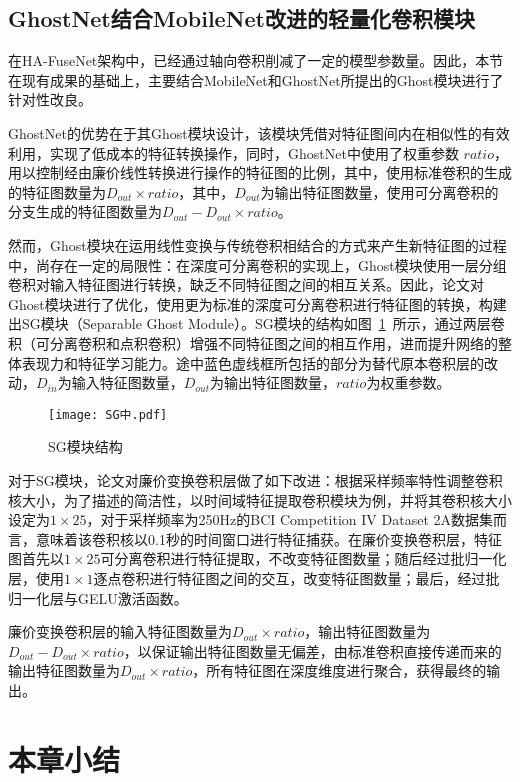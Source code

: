 \subsection{GhostNet结合MobileNet改进的轻量化卷积模块}

在HA-FuseNet架构中，已经通过轴向卷积削减了一定的模型参数量。因此，本节在现有成果的基础上，主要结合MobileNet和GhostNet所提出的Ghost模块进行了针对性改良。

GhostNet的优势在于其Ghost模块设计，该模块凭借对特征图间内在相似性的有效利用，实现了低成本的特征转换操作，同时，GhostNet中使用了权重参数 \(ratio\)，用以控制经由廉价线性转换进行操作的特征图的比例，其中，使用标准卷积的生成的特征图数量为\(D_{out} \times ratio\)，其中，\(D_{out}\)为输出特征图数量，使用可分离卷积的分支生成的特征图数量为\(D_{out}-D_{out} \times ratio\)。

然而，Ghost模块在运用线性变换与传统卷积相结合的方式来产生新特征图的过程中，尚存在一定的局限性：在深度可分离卷积的实现上，Ghost模块使用一层分组卷积对输入特征图进行转换，缺乏不同特征图之间的相互关系。因此，论文对Ghost模块进行了优化，使用更为标准的深度可分离卷积进行特征图的转换，构建出SG模块（Separable Ghost Module）。SG模块的结构如图~\ref{fig:sg}~所示，通过两层卷积（可分离卷积和点积卷积）增强不同特征图之间的相互作用，进而提升网络的整体表现力和特征学习能力。途中蓝色虚线框所包括的部分为替代原本卷积层的改动，\(D_{in}\)为输入特征图数量，\(D_{out}\)为输出特征图数量，\(ratio\)为权重参数。
\begin{figure}[ht]
    \centering
    \texttt{[image: SG中.pdf]}
    \caption{SG模块结构}
    \label{fig:sg}
\end{figure}

对于SG模块，论文对廉价变换卷积层做了如下改进：根据采样频率特性调整卷积核大小，为了描述的简洁性，以时间域特征提取卷积模块为例，并将其卷积核大小设定为\(1 \times 25\)，对于采样频率为250Hz的BCI Competition IV Dataset 2A数据集而言，意味着该卷积核以0.1秒的时间窗口进行特征捕获。在廉价变换卷积层，特征图首先以\(1 \times 25\)可分离卷积进行特征提取，不改变特征图数量；随后经过批归一化层，使用\(1 \times 1\)逐点卷积进行特征图之间的交互，改变特征图数量；最后，经过批归一化层与GELU激活函数。

廉价变换卷积层的输入特征图数量为\(D_{out} \times ratio\)，输出特征图数量为\(D_{out}-D_{out} \times ratio\)，以保证输出特征图数量无偏差，由标准卷积直接传递而来的输出特征图数量为\(D_{out} \times ratio\)，所有特征图在深度维度进行聚合，获得最终的输出。

\section{本章小结}

